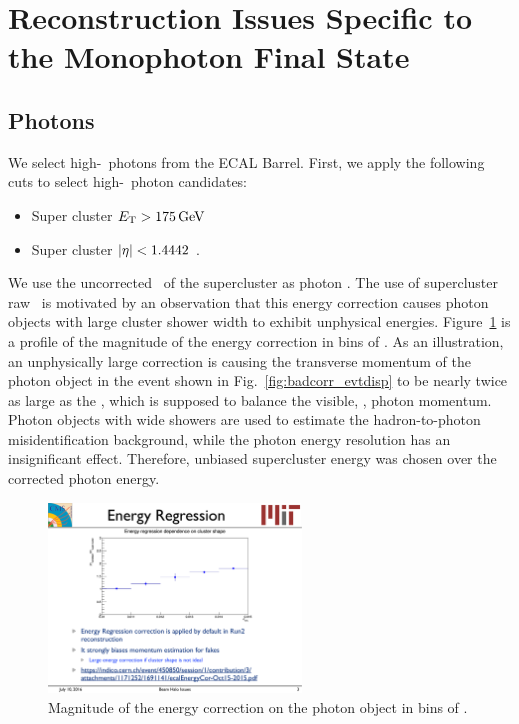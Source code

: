 \iffalse
\section{Reconstruction Issues Specific to the Monophoton Final State}
\label{sec:issues}

\subsection{Photons}
\label{sec:ana_photons}

We select high-\ET\ photons from the ECAL Barrel. First, we apply the following cuts to select high-\ET\ photon candidates:
\begin{itemize}
\item Super cluster $E_{\mathrm{T}} > 175\,\text{Ge\hspace{-.08em}V}$
\item Super cluster $\lvert \eta \rvert < 1.4442$ .
\end{itemize}
We use the uncorrected \ET\ of the supercluster as photon \ET. 
The use of supercluster raw \ET\ is motivated by an observation that this energy correction causes photon objects with large cluster shower width to exhibit unphysical energies. 
Figure~\ref{fig:corr_vs_sieie} is a profile of the magnitude of the energy correction in bins of \sieie. 
As an illustration, an unphysically large correction is causing the transverse momentum of the photon object in the event shown in Fig.~\ref{fig:badcorr_evtdisp} to be nearly twice as large as the \met, which is supposed to balance the visible, \ie, photon momentum. 
Photon objects with wide showers are used to estimate the hadron-to-photon misidentification background, while the photon energy resolution has an insignificant effect. 
Therefore, unbiased supercluster energy was chosen over the corrected photon energy.

\begin{figure}[htbp]
  \begin{center}
    \includegraphics[width=0.6\textwidth]{Reconstruction/Figures/corr_vs_sieie.pdf}
    \caption{
      Magnitude of the energy correction on the photon object in bins of \sieie.
    }
    \label{fig:corr_vs_sieie}
  \end{center}
\end{figure}

